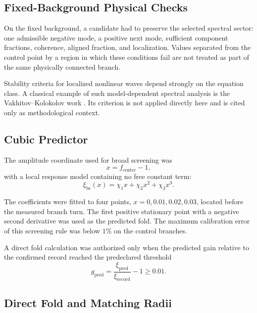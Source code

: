 \documentclass[11pt,a4paper]{article}
\begin{document}
\subsection{Fixed-Background Physical Checks}

On the fixed background, a candidate had to preserve the selected spectral sector: one admissible negative mode, a positive next mode, sufficient component fractions, coherence, aligned fraction, and localization. Values separated from the control point by a region in which these conditions fail are not treated as part of the same physically connected branch.

Stability criteria for localized nonlinear waves depend strongly on the equation class. A classical example of such model-dependent spectral analysis is the Vakhitov--Kolokolov work \cite{vakhitov1973}. Its criterion is not applied directly here and is cited only as methodological context.

\subsection{Cubic Predictor}

The amplitude coordinate used for broad screening was
\begin{equation}
x=f_{\mathrm{center}}-1,
\end{equation}
with a local response model containing no free constant term:
\begin{equation}
\xi_{\mathrm{br}}(x)
=\chi_1x+\chi_2x^2+\chi_3x^3.
\label{eq:cubic_predictor}
\end{equation}

The coefficients were fitted to four points, $x=0,0.01,0.02,0.03$, located before the measured branch turn. The first positive stationary point with a negative second derivative was used as the predicted fold. The maximum calibration error of this screening rule was below $1\%$ on the control branches.

A direct fold calculation was authorized only when the predicted gain relative to the confirmed record reached the predeclared threshold
\begin{equation}
g_{\mathrm{pred}}
=\frac{\xi_{\mathrm{pred}}}{\xi_{\mathrm{record}}}-1
\geq 0.01.
\label{eq:one_percent_gate}
\end{equation}

\subsection{Direct Fold and Matching Radii}
\end{document}

